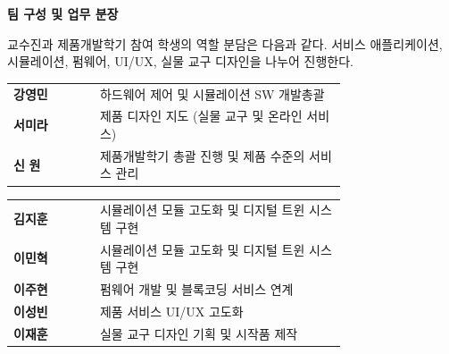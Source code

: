 \thispagestyle{fancy}

\begin{center}
  {\sffamily\bfseries\LARGE\color{deepblue}팀 구성 및 업무 분장}
\end{center}
\vspace{1.4em}

\noindent 교수진과 제품개발학기 참여 학생의 역할 분담은 다음과 같다. 서비스 애플리케이션,
시뮬레이션, 펌웨어, UI/UX, 실물 교구 디자인을 나누어 진행한다.

\vspace{1.6em}
\begin{center}
\renewcommand{\arraystretch}{1.5}
\begin{tabularx}{\linewidth}{@{}>{\sffamily\bfseries}l L{0.74\linewidth}@{}}
\toprule
\sffamily 강영민 & 하드웨어 제어 및 시뮬레이션 SW 개발총괄 \\
\sffamily 서미라 & 제품 디자인 지도 (실물 교구 및 온라인 서비스) \\
\sffamily 신\,\,원 & 제품개발학기 총괄 진행 및 제품 수준의 서비스 관리 \\
\bottomrule
\end{tabularx}
\end{center}

\vspace{1.2em}
\begin{center}
\renewcommand{\arraystretch}{1.5}
\begin{tabularx}{\linewidth}{@{}>{\sffamily\bfseries}l L{0.74\linewidth}@{}}
\toprule
\sffamily 김지훈 & 시뮬레이션 모듈 고도화 및 디지털 트윈 시스템 구현 \\
\sffamily 이민혁 & 시뮬레이션 모듈 고도화 및 디지털 트윈 시스템 구현 \\
\sffamily 이주현 & 펌웨어 개발 및 블록코딩 서비스 연계 \\
\sffamily 이성빈 & 제품 서비스 UI/UX 고도화 \\
\sffamily 이재훈 & 실물 교구 디자인 기획 및 시작품 제작 \\
\bottomrule
\end{tabularx}
\end{center}
